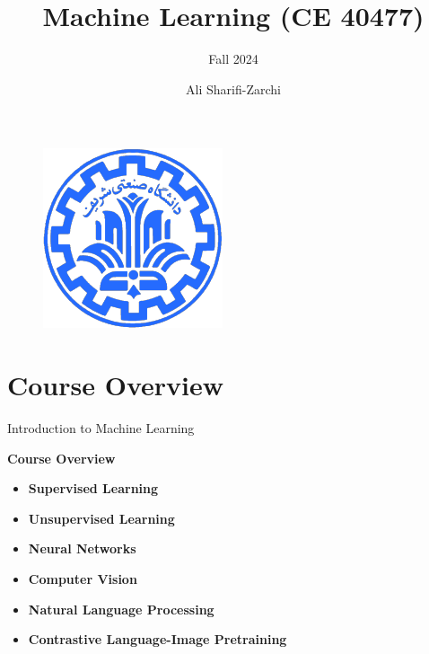 \documentclass[serif, aspectratio=169]{beamer}
\author{Ali Sharifi-Zarchi}
\title{Machine Learning (CE 40477)}
\subtitle{Fall 2024}
\institute{
    CE Department \\
    Sharif University of Technology
}
\begin{document}
\begin{frame}
    \titlepage
    \vspace*{-0.6cm}
    \begin{figure}[htpb]
        \begin{center}
            \includegraphics[keepaspectratio, scale=0.25]{pic/sharif-main-logo.png}
        \end{center}
    \end{figure}
\end{frame}

\begin{frame}    
\tableofcontents[sectionstyle=show,
subsectionstyle=show/shaded/hide,
subsubsectionstyle=show/shaded/hide]
\end{frame}

\section{Course Overview}
\begin{frame}{Introduction to Machine Learning}

\textbf{Course Overview}

\begin{itemize}
    \item \textbf{Supervised Learning}
    \item \textbf{Unsupervised Learning}
    \item \textbf{Neural Networks}
    \item \textbf{Computer Vision}
    \item \textbf{Natural Language Processing}
    \item \textbf{Contrastive Language-Image Pretraining}

\end{itemize}

\end{frame}
\end{document}
